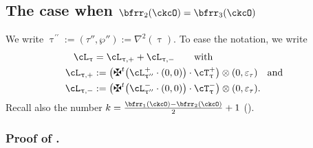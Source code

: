 \documentclass[12pt,a4paper]{amsart}
\newcommand{\trivial}[2][]{\if\relax\detokenize{#1}\relax
  {%
      \color{orange} \vspace{0em} $[$  #2 $]$
      \color{black}
  }
  \else
\ifx#1h
\ifcsname showtrivial\endcsname
{%
    \color{orange} \vspace{0em}  $[$ #2 $]$
    \color{black}
}
\fi
\else {\red Wrong argument!} \fi
\fi
}
\newcommand{\AC}{\mathrm{AC}}
\def\MYD{{\mathsf{MYD}}}
\def\DD{\nabla}
\numberwithin{equation}{section}
\theoremstyle{remark}
\def\uptaup{\uptau^{\prime}}
\def\uptaupp{\uptau^{\prime\prime}}
\begin{document}









\subsection*{The case when $\bfrr_{2}(\ckcO)=\bfrr_{3}(\ckcO)$}
\def\ppac#1{\cL_{#1,+}}
\def\nnac#1{\cL_{#1,-}}

We write $\uptaupp :=(\tau'',\wp''):= \DD^{2}(\uptau)$.
To ease the notation, we write
\begin{equation}
 \label{eq:BD4}
  \begin{split}
    \ac_{\uptau} & = \ppac{\uptau} + \nnac{\uptau} \qquad \text{with} \\
  \ppac{\uptau} & := \left(\maltese^t \big(\pac{\uptaupp}\cdot (0,0)\big) \cdot \pcT_{\uptau}\right)\lotimes (0,\varepsilon_\tau) \AND \\
  \nnac{\uptau} & := \left(\maltese^t \big(\nac{\uptaupp}\cdot (0,0)\big) \cdot \ncT_{\uptau}\right)\lotimes (0,\varepsilon_\tau).
  \end{split}
\end{equation}
Recall also the number $k = \frac{\bfrr_1(\ckcO)-\bfrr_2(\ckcO)}{2}+1$ ().

\subsubsection*{Proof of . }
\end{document}
